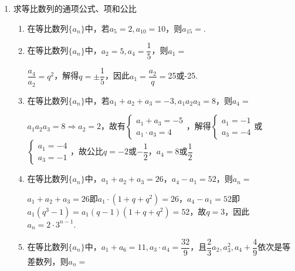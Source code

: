 \begin{enumerate}
\begin{enumerate}
\begin{jieda}
        \end{jieda}
    \end{enumerate}
    \item 求等比数列的通项公式、项和公比
    \begin{enumerate}
        \item 在等比数列$\{a_n\}$中，若$a_5 = 2, a_{10} = 10$，则$a_{15} = $.
        \item 在等比数列$\{a_n\}$中，$a_2 = 5, a_4 = \dfrac{1}{5}$，则$a_1 = $
        \begin{jieda}
            $\dfrac{a_4}{a_2} = q^2$，解得$q = \pm \dfrac{1}{5}$，因此$a_1 = \dfrac{a_2}{q} = $25或-25.
        \end{jieda}
        \item 在等比数列$\{a_n\}$中，若$a_1 + a_2 + a_3 = -3, a_1 a_2 a_3 = 8$，则$a_4 = $
        \begin{jieda}
            $a_1 a_2 a_3 = 8 \Rightarrow a_2 = 2$，故有$\left \{ \begin{array}{l}
                 a_1 + a_3 = -5  \\
                 a_1 \cdot a_3 = 4
            \end{array} \right .$，解得$\left \{\begin{array}{l}
                 a_1 = -1  \\
                 a_3 = -4
            \end{array} \right.$或$\left \{\begin{array}{l}
                 a_1 = -4  \\
                 a_3 = -1
            \end{array} \right.$，故公比$q = -2$或$-\dfrac{1}{2}$，$a_4 = $8或$\dfrac{1}{2}$
        \end{jieda}
        \item 在等比数列$\{a_n\}$中，$a_1 + a_2 + a_3 = 26$，$a_4 - a_1 = 52$，则$a_n = $
        \begin{jieda}
            $a_1 + a_2 + a_3 = 26$即$a_1 \cdot (1 + q + q^2) = 26$，$a_4 - a_1 = 52$即$a_1(q^3 - 1) = a_1 (q-1)(1 + q + q^2) = 52$，故$q = 3$，因此$a_n = 2\cdot 3^{n-1}$.
        \end{jieda}
        \item 在等比数列$\{a_n\}$中，$a_1 + a_6 = 11, a_3 \cdot a_4 = \dfrac{32}{9}$，且$\dfrac{2}{3}a_2, a_3^2, a_4+\dfrac{4}{9}$依次是等差数列，则$a_n = $
        \begin{jieda}

\end{jieda}
\end{enumerate}
\end{enumerate}
